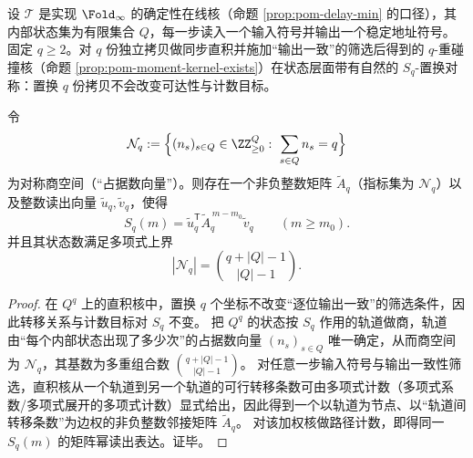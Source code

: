 \begin{proposition}\label{prop:pom-moment-symmetric-power}
设 \(\mathcal{T}\) 是实现 \(\Fold_\infty\) 的确定性在线核（命题 \ref{prop:pom-delay-min} 的口径），其内部状态集为有限集合 \(Q\)，每一步读入一个输入符号并输出一个稳定地址符号。
固定 \(q\ge 2\)。对 \(q\) 份独立拷贝做同步直积并施加“输出一致”的筛选后得到的 \(q\)-重碰撞核（命题 \ref{prop:pom-moment-kernel-exists}）在状态层面带有自然的 \(S_q\)-置换对称：置换 \(q\) 份拷贝不会改变可达性与计数目标。

令
$$
\mathcal{N}_{q}:=\Bigl\{(n_s)_{s\in Q}\in\ZZ_{\ge 0}^{Q}:\ \sum_{s\in Q}n_s=q\Bigr\}
$$
为对称商空间（“占据数向量”）。则存在一个非负整数矩阵 \(\widetilde A_q\)（指标集为 \(\mathcal{N}_q\)）以及整数读出向量 \(\widetilde u_q,\widetilde v_q\)，使得
$$
S_q(m)=\widetilde u_q^{\mathsf T}\widetilde A_q^{\,m-m_0}\widetilde v_q\qquad(m\ge m_0).
$$
并且其状态数满足多项式上界
$$
|\mathcal{N}_q|=\binom{q+|Q|-1}{|Q|-1}.
$$
\end{proposition}

\begin{proof}
在 \(Q^q\) 上的直积核中，置换 \(q\) 个坐标不改变“逐位输出一致”的筛选条件，因此转移关系与计数目标对 \(S_q\) 不变。
把 \(Q^q\) 的状态按 \(S_q\) 作用的轨道做商，轨道由“每个内部状态出现了多少次”的占据数向量 \((n_s)_{s\in Q}\) 唯一确定，从而商空间为 \(\mathcal{N}_q\)，其基数为多重组合数 \(\binom{q+|Q|-1}{|Q|-1}\)。
对任意一步输入符号与输出一致性筛选，直积核从一个轨道到另一个轨道的可行转移条数可由多项式计数（多项式系数/多项式展开的多项式计数）显式给出，因此得到一个以轨道为节点、以“轨道间转移条数”为边权的非负整数邻接矩阵 \(\widetilde A_q\)。
对该加权核做路径计数，即得同一 \(S_q(m)\) 的矩阵幂读出表达。证毕。
\end{proof}

